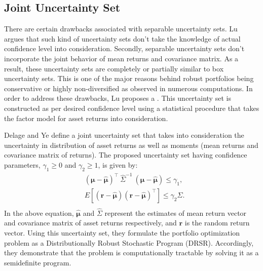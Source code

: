 \subsection{Joint Uncertainty Set}
  There are certain drawbacks associated with separable uncertainty sets. Lu \cite{lu} argues that such kind of uncertainty sets don't take the knowledge of actual confidence level into consideration. Secondly, separable uncertainty sets don't incorporate the joint behavior of mean returns and covariance matrix. As a result, these uncertainty sets are completely or partially similar to box uncertainty sets. This is one of the major reasons behind robust portfolios being conservative or highly non-diversified as observed in numerous computations. In order to address these drawbacks, Lu proposes a . This uncertainty set is constructed as per desired confidence level using a statistical procedure that takes the factor model \cite{goldfarb2} for asset returns into consideration.

Delage and Ye \cite{delage} define a joint uncertainty set that takes into consideration the uncertainty in distribution of asset returns as well as moments (mean returns and covariance matrix of returns). The proposed uncertainty set having confidence parameters, $\gamma_{1} \geq 0$ and $\gamma_{2} \geq 1$, is given by:
\begin{equation}
\begin{split}
    & (\boldsymbol{\mu} - \boldsymbol{\hat{\mu}})^{\top} \ \hat{\Sigma}^{-1} \ (\boldsymbol{\mu} - \boldsymbol{\hat{\mu}}) \leq \gamma_{1}, \\
    & E[(\mathbf{r} - \boldsymbol{\hat{\mu}})(\mathbf{r} - \boldsymbol{\hat{\mu}})^{\top}] \leq \gamma_{2}\hat{\Sigma}. \\
\end{split}
\end{equation}
In the above equation, $\boldsymbol{\hat{\mu}}$ and $\hat{\Sigma}$ represent the estimates of mean return vector and covariance matrix of asset returns respectively, and $\mathbf{r}$ is the random return vector. Using this uncertainty set, they formulate the portfolio optimization problem as a Distributionally Robust Stochastic Program (DRSR). Accordingly, they demonstrate that the problem is computationally tractable by solving it as a semidefinite program. 

